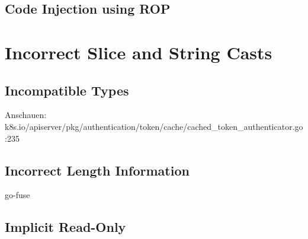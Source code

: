 
\subsection{Code Injection using ROP}\label{subsec:unsafe-security-problems:buffer-overflow:code-injection}






\section{Incorrect Slice and String Casts}\label{sec:unsafe-security-problems:slice-casts}


\subsection{Incompatible Types}\label{subsec:unsafe-security-problems:slice-casts:incompatible-types}

Anschauen: k8s.io/apiserver/pkg/authentication/token/cache/cached\_token\_authenticator.go:235





\subsection{Incorrect Length Information}\label{subsec:unsafe-security-problems:slice-casts:incorrect-length}

go-fuse



\subsection{Implicit Read-Only}\label{subsec:unsafe-security-problems:slice-casts:read-only}


